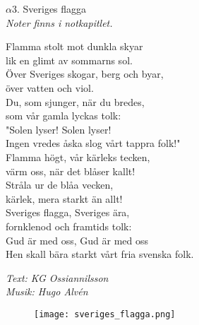 \documentclass[a6paper,10pt]{article}
\begin{document}
\setlength{\oddsidemargin}{-0.37in}
\begin{center}
\Large{$\alpha3$. Sveriges flagga}\\
\small\textit{Noter finns i notkapitlet.}
\end{center}
Flamma stolt mot dunkla skyar\\
lik en glimt av sommarns sol.\\
Över Sveriges skogar, berg och byar,\\
över vatten och viol.\\
Du, som sjunger, när du bredes,\\
som vår gamla lyckas tolk:\\
"Solen lyser! Solen lyser!\\
Ingen vredes åska slog vårt tappra folk!"
\vspace{5pt}\\
Flamma högt, vår kärleks tecken,\\
värm oss, när det blåser kallt!\\
Stråla ur de blåa vecken,\\
kärlek, mera starkt än allt!\\
Sveriges flagga, Sveriges ära,\\
fornklenod och framtids tolk:\\
Gud är med oss, Gud är med oss\\
Hen skall bära starkt vårt fria svenska folk. 
\begin{flushright}
\textit{Text: KG Ossiannilsson\\
Musik: Hugo Alvén}
\end{flushright}
\vspace{20pt}
\begin{figure}[!h]
\centering
\texttt{[image: sveriges\_flagga.png]}
\end{figure}
\end{document}
